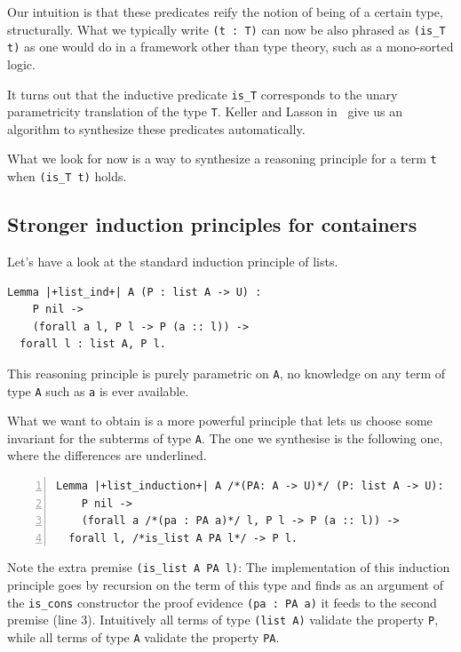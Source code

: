 \documentclass[sigplan,10pt,review]{acmart}\settopmatter{printfolios=true,printccs=false,printacmref=false}
\begin{document}
Our intuition is that these predicates reify the notion of being
of a certain type, structurally. What we typically write \lstinline+(t : T)+
can now be also phrased as \lstinline+(is_T t)+ as one would do in a
framework other than type theory, such as a mono-sorted logic.

It turns out that the inductive predicate \lstinline+is_T+ corresponds
to the unary parametricity translation of the type \lstinline+T+.
Keller and Lasson in~\cite{keller:hal-00730913} give us an
algorithm to synthesize these predicates automatically.

What we look for now is a way to synthesize
a reasoning principle for a term \lstinline+t+ when 
\lstinline+(is_T t)+ holds.

\subsection{Stronger induction principles for containers} %

Let's have a look at the standard induction principle of lists.

\begin{minipage}{\textwidth}\begin{lstlisting}
Lemma |+list_ind+| A (P : list A -> U) :
    P nil ->
    (forall a l, P l -> P (a :: l)) ->
  forall l : list A, P l.
\end{lstlisting}\end{minipage}

\noindent
This reasoning principle is purely parametric on \lstinline+A+, no
knowledge on any term of type \lstinline+A+ such as \lstinline+a+ is
ever available.

What we want to obtain is a more powerful principle that lets us choose
some invariant for the subterms of type \lstinline+A+. The one we
synthesise is the following one, where the differences are underlined.

\begin{minipage}{\textwidth}\begin{lstlisting}[numbers=left]
Lemma |+list_induction+| A /*(PA: A -> U)*/ (P: list A -> U):
    P nil ->
    (forall a /*(pa : PA a)*/ l, P l -> P (a :: l)) ->
  forall l, /*is_list A PA l*/ -> P l.
\end{lstlisting}\end{minipage}

\noindent
Note the extra premise \lstinline+(is_list A PA l)+: The
implementation of this induction principle
goes by recursion on the term of this type and finds
as an argument of the \lstinline+is_cons+ constructor
the proof evidence \lstinline+(pa : PA a)+ it feeds to the second premise
(line 3). Intuitively all terms of type \lstinline+(list A)+
validate the property \lstinline+P+, while all terms of type
\lstinline+A+ validate the property \lstinline+PA+.
\end{document}
